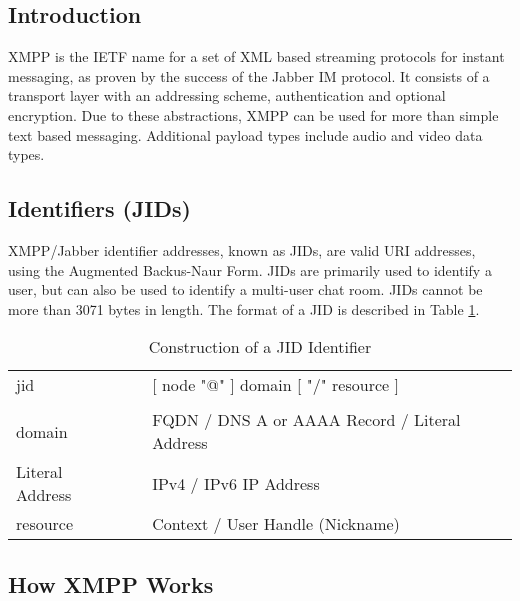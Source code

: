 
\subsection{Introduction}

XMPP is the IETF name for a set of XML based streaming protocols for
instant messaging, as proven by the success of the Jabber IM protocol.
It consists of a transport layer with an addressing scheme, 
authentication and optional encryption. Due to these abstractions, XMPP 
can be used for more than simple text based messaging. Additional 
payload types include audio and video data types.

\subsection{Identifiers (JIDs)}

XMPP/Jabber identifier addresses, known as JIDs, are valid URI 
addresses, using the Augmented Backus-Naur Form. JIDs are primarily used 
to identify a user, but can also be used to identify a multi-user 
chat room. JIDs cannot be more than 3071 bytes in length. The format of a
JID is described in Table \ref{tab:jid}.

\begin{table}[hb]

\label{tab:jid}

\begin{center}

\begin{tabular}{lll}
jid		&		&	[ node "@" ] domain [ "/" resource ]				\\
			&		&																	\\
domain	&		&	FQDN / DNS A or AAAA Record / Literal Address	\\
Literal Address	&		&	IPv4 / IPv6 IP Address						\\
resource &		&	Context / User Handle (Nickname)						\\
\end{tabular}

\end{center}

\caption{Construction of a JID Identifier}

\end{table}

\subsection{How XMPP Works}

